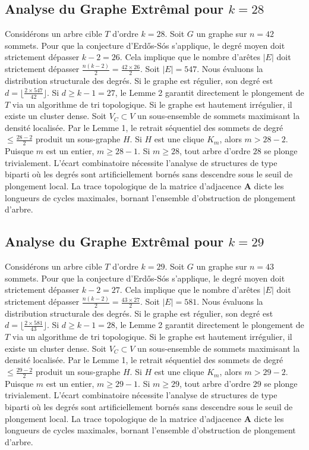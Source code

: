 \documentclass[11pt,a4paper]{article}
\begin{document}
\subsection{Analyse du Graphe Extr\^emal pour $k=28$}
Consid\'erons un arbre cible $T$ d'ordre $k=28$.
Soit $G$ un graphe sur $n=42$ sommets.
Pour que la conjecture d'Erd\H{o}s-S\'os s'applique, le degr\'e moyen doit strictement d\'epasser $k-2 = 26$.
Cela implique que le nombre d'ar\^etes $|E|$ doit strictement d\'epasser $\frac{n(k-2)}{2} = \frac{42 \times 26}{2}$.
Soit $|E| = 547$.
Nous \'evaluons la distribution structurale des degr\'es. Si le graphe est r\'egulier, son degr\'e est $d = \lfloor \frac{2 \times 547}{42} \rfloor$.
Si $d \geq k-1 = 27$, le Lemme 2 garantit directement le plongement de $T$ via un algorithme de tri topologique.
Si le graphe est hautement irr\'egulier, il existe un cluster dense. Soit $V_C \subset V$ un sous-ensemble de sommets maximisant la densit\'e localis\'ee.
Par le Lemme 1, le retrait s\'equentiel des sommets de degr\'e $\leq \frac{28-2}{2}$ produit un sous-graphe $H$.
Si $H$ est une clique $K_{m}$, alors $m > 28-2$. Puisque $m$ est un entier, $m \geq 28-1$. Si $m \geq 28$, tout arbre d'ordre $28$ se plonge trivialement.
L'\'ecart combinatoire n\'ecessite l'analyse de structures de type biparti o\`u les degr\'es sont artificiellement born\'es sans descendre sous le seuil de plongement local. La trace topologique de la matrice d'adjacence $\mathbf{A}$ dicte les longueurs de cycles maximales, bornant l'ensemble d'obstruction de plongement d'arbre.


\subsection{Analyse du Graphe Extr\^emal pour $k=29$}
Consid\'erons un arbre cible $T$ d'ordre $k=29$.
Soit $G$ un graphe sur $n=43$ sommets.
Pour que la conjecture d'Erd\H{o}s-S\'os s'applique, le degr\'e moyen doit strictement d\'epasser $k-2 = 27$.
Cela implique que le nombre d'ar\^etes $|E|$ doit strictement d\'epasser $\frac{n(k-2)}{2} = \frac{43 \times 27}{2}$.
Soit $|E| = 581$.
Nous \'evaluons la distribution structurale des degr\'es. Si le graphe est r\'egulier, son degr\'e est $d = \lfloor \frac{2 \times 581}{43} \rfloor$.
Si $d \geq k-1 = 28$, le Lemme 2 garantit directement le plongement de $T$ via un algorithme de tri topologique.
Si le graphe est hautement irr\'egulier, il existe un cluster dense. Soit $V_C \subset V$ un sous-ensemble de sommets maximisant la densit\'e localis\'ee.
Par le Lemme 1, le retrait s\'equentiel des sommets de degr\'e $\leq \frac{29-2}{2}$ produit un sous-graphe $H$.
Si $H$ est une clique $K_{m}$, alors $m > 29-2$. Puisque $m$ est un entier, $m \geq 29-1$. Si $m \geq 29$, tout arbre d'ordre $29$ se plonge trivialement.
L'\'ecart combinatoire n\'ecessite l'analyse de structures de type biparti o\`u les degr\'es sont artificiellement born\'es sans descendre sous le seuil de plongement local. La trace topologique de la matrice d'adjacence $\mathbf{A}$ dicte les longueurs de cycles maximales, bornant l'ensemble d'obstruction de plongement d'arbre.
\end{document}

